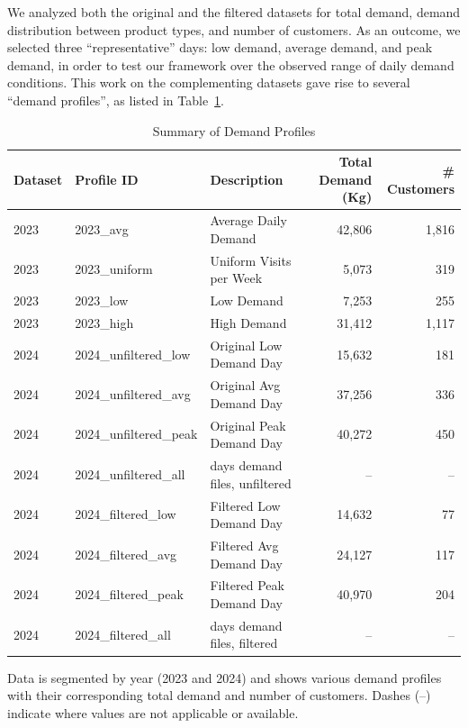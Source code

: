 We analyzed both the original and the filtered datasets for total demand, demand distribution between product types, and number of customers. As an outcome, we selected three “representative” days: low demand, average demand, and peak demand, in order to test our framework over the observed range of daily demand conditions.
This work on the complementing datasets gave rise to several “demand profiles”, as listed in Table~\ref{tab:demand-profiles}.

\begin{table}[htbp]
\centering
\begin{threeparttable}
\caption{Summary of Demand Profiles}
\label{tab:demand-profiles}
\setlength{\tabcolsep}{12pt}
\begin{tabular}{
    l
    l
    >{\raggedright\arraybackslash}p{3.5cm}
    r
    r
}
\toprule
Dataset & Profile ID & Description & Total Demand (Kg) & \# Customers \\
\midrule
2023 & 2023\_avg & Average Daily Demand & 42,806 & 1,816 \\
2023 & 2023\_uniform & Uniform Visits per Week & 5,073 & 319 \\
2023 & 2023\_low & Low Demand & 7,253 & 255 \\
2023 & 2023\_high & High Demand & 31,412 & 1,117 \\
\midrule
2024 & 2024\_unfiltered\_low & Original Low Demand Day & 15,632 & 181 \\
2024 & 2024\_unfiltered\_avg & Original Avg Demand Day & 37,256 & 336 \\
2024 & 2024\_unfiltered\_peak & Original Peak Demand Day & 40,272 & 450 \\
2024 & 2024\_unfiltered\_all & 73 days demand files, unfiltered & -- & -- \\
2024 & 2024\_filtered\_low & Filtered Low Demand Day & 14,632 & 77 \\
2024 & 2024\_filtered\_avg & Filtered Avg Demand Day & 24,127 & 117 \\
2024 & 2024\_filtered\_peak & Filtered Peak Demand Day & 40,970 & 204 \\
2024 & 2024\_filtered\_all & 73 days demand files, filtered & -- & -- \\
\bottomrule
\end{tabular}
\label{tab:demand-profiles}
\begin{tablenotes}
\small
\item[Note:] Data is segmented by year (2023 and 2024) and shows various demand profiles with their corresponding total demand and number of customers. Dashes (--) indicate where values are not applicable or available.
\end{tablenotes}
\end{threeparttable}
\end{table}

